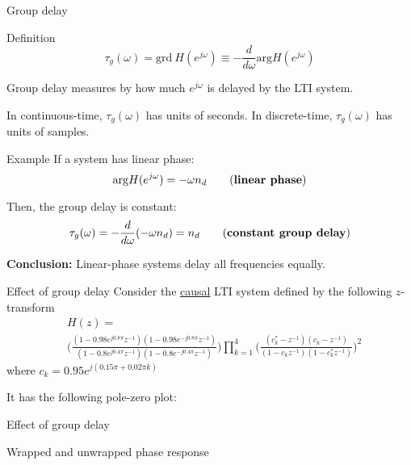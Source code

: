 \documentclass[10pt, aspectratio=169]{beamer}
\begin{document}
%
\begin{frame}{Group delay}
	\begin{block}{Definition}
		\begin{equation*}
			\tau_g(\omega) = \mathrm{grd}~ H(e^{j\omega}) \equiv -\dfrac{d}{d\omega}\mathrm{arg} H(e^{j\omega}) \tag{group delay}
		\end{equation*}
		
		Group delay measures by how much $e^{j\omega}$ is delayed by the LTI system. 
		
		In continuous-time, $\tau_g(\omega)$ has units of seconds. In discrete-time, $\tau_g(\omega)$ has units of samples.
	\end{block}
	
	\begin{block}{Example}
		If a system has linear phase:
		\begin{equation*}
			\mathrm{arg} H(e^{j\omega}) = -\omega n_d \tag{\textbf{linear phase}}
		\end{equation*} 
		
		Then, the group delay is constant:
		\begin{equation*}
		\tau_g(\omega) = -\dfrac{d}{d\omega}(-\omega n_d) = n_d \tag{\textbf{constant group delay}}
		\end{equation*} 
		
		\textbf{Conclusion:} Linear-phase systems delay all frequencies equally.	
	\end{block}
\end{frame}


\begin{frame}{Effect of group delay}
	Consider the \underline{causal} LTI system defined by the following $z$-transform
	\begin{align*}
	&H(z) = \\ &\bigg(\frac{(1-0.98e^{j0.8\pi}z^{-1})(1-0.98e^{-j0.8\pi}z^{-1})}{(1-0.8e^{j0.4\pi}z^{-1})(1-0.8e^{-j0.4\pi}z^{-1})}\bigg)\prod_{k=1}^4\bigg(\frac{(c_k^* -z^{-1})(c_k -z^{-1})}{(1 -c_kz^{-1})(1 -c_k^*z^{-1})}\bigg)^2
	\end{align*}
	where $c_k = 0.95e^{j(0.15\pi + 0.02\pi k)}$
	
	It has the following pole-zero plot:
	
	\begin{center}
		\resizebox{0.32\linewidth}{!}{}
	\end{center}
\end{frame}

%
\begin{frame}{Effect of group delay}
	\begin{block}{Wrapped and unwrapped phase response}
		\begin{center}
		\end{center}		
	\end{block}
\end{frame}
\end{document}
